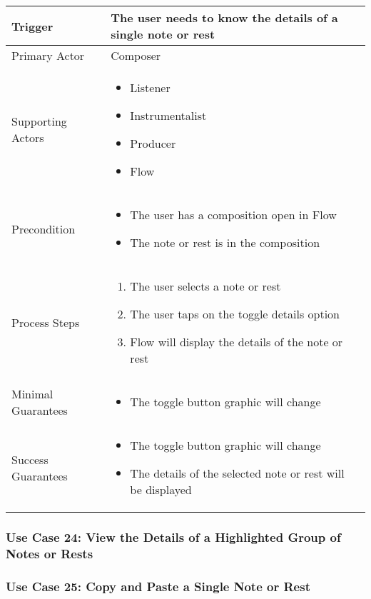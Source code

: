 \begin{tabularx}{\textwidth}{|X|X|}
\hline
Trigger & 
The user needs to know the details of a single note or rest\\
\hline
Primary Actor & 
Composer \\
\hline
Supporting Actors & 
\begin{itemize}
\item Listener
\item Instrumentalist
\item Producer
\item Flow
\end{itemize} \\
\hline
Precondition & 
\begin{itemize}
\item The user has a composition open in Flow
\item The note or rest is in the composition
\end{itemize} \\
\hline
Process Steps & 
\begin{enumerate}
\item The user selects a note or rest
\item The user taps on the toggle details option
\item Flow will display the details of the note or rest
\end{enumerate} \\
\hline
Minimal Guarantees & 
\begin{itemize}
  \item The toggle button graphic will change
\end{itemize} \\
\hline
Success Guarantees & 
\begin{itemize}
  \item The toggle button graphic will change
  \item The details of the selected note or rest will be displayed 
\end{itemize} \\
\hline
\end{tabularx}


\subsubsection{Use Case 24: View the Details of a Highlighted Group of Notes or Rests}


\subsubsection{Use Case 25: Copy and Paste a Single Note or Rest}

